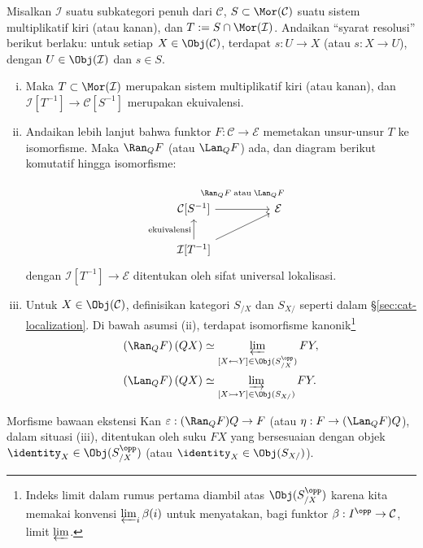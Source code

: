\begin{proposisi}\label{prop:injective-localization}
	Misalkan $\mathcal{I}$ suatu subkategori penuh dari $\mathcal{C}$,
	$S \subset \Mor(\mathcal{C})$ suatu sistem multiplikatif kiri (atau
	kanan), dan $T := S \cap \Mor(\mathcal{I})$. Andaikan ``syarat resolusi''
	berikut berlaku: untuk setiap $X \in \Obj(\mathcal{C})$, terdapat
	$s: U \to X$ (atau $s: X \to U$), dengan
	$U \in \Obj(\mathcal{I})$ dan $s \in S$.
	\begin{enumerate}[(i)]
		\item Maka $T \subset \Mor(\mathcal{I})$ merupakan sistem
		multiplikatif kiri (atau kanan), dan
		$\mathcal{I}[T^{-1}] \to \mathcal{C}[S^{-1}]$ merupakan ekuivalensi.
		\item Andaikan lebih lanjut bahwa funktor
		$F: \mathcal{C} \to \mathcal{E}$ memetakan unsur-unsur $T$ ke
		isomorfisme. Maka $\Ran_Q F$ (atau $\Lan_Q F$) ada, dan diagram berikut
		komutatif hingga isomorfisme:
		\[\begin{tikzcd}[column sep=huge]
			\mathcal{C}[S^{-1}] \arrow[r, "{\Ran_Q F \;\text{atau}\; \Lan_Q F }" inner sep=1em] & \mathcal{E} \\
			\mathcal{I}[T^{-1}] \arrow[u, "\text{ekuivalensi}"] \arrow[ru]
		\end{tikzcd}\]
		dengan $\mathcal{I}[T^{-1}] \to \mathcal{E}$ ditentukan oleh sifat
		universal lokalisasi.
		\item Untuk $X \in \Obj(\mathcal{C})$, definisikan kategori $S_{/X}$
		dan $S_{X/}$ seperti dalam \S\ref{sec:cat-localization}. Di bawah
		asumsi (ii), terdapat isomorfisme kanonik\footnote{Indeks limit dalam
		rumus pertama diambil atas $\Obj(S_{/X}^{\opp})$ karena kita memakai
		konvensi $\varprojlim_i \beta(i)$ untuk menyatakan, bagi funktor
		$\beta: I^{\opp} \to \mathcal{C}$, limit $\varprojlim$.}
		\begin{align*}
			\left(\Ran_Q F\right) (QX) & \simeq \varprojlim_{[X \leftarrowtail Y] \in \Obj(S_{/X}^{\opp})} FY , \\
			\left(\Lan_Q F\right) (QX) & \simeq \varinjlim_{[X \rightarrowtail Y] \in \Obj(S_{X/})} FY.
		\end{align*}
	\end{enumerate}

	Morfisme bawaan ekstensi Kan
	$\varepsilon: (\Ran_Q F) Q \to F$ (atau
	$\eta: F \to (\Lan_Q F) Q$), dalam situasi (iii), ditentukan oleh
	suku $FX$ yang bersesuaian dengan objek
	$\identity_X \in \Obj(S_{/X}^{\opp})$ (atau
	$\identity_X \in \Obj(S_{X/})$).
\end{proposisi}
